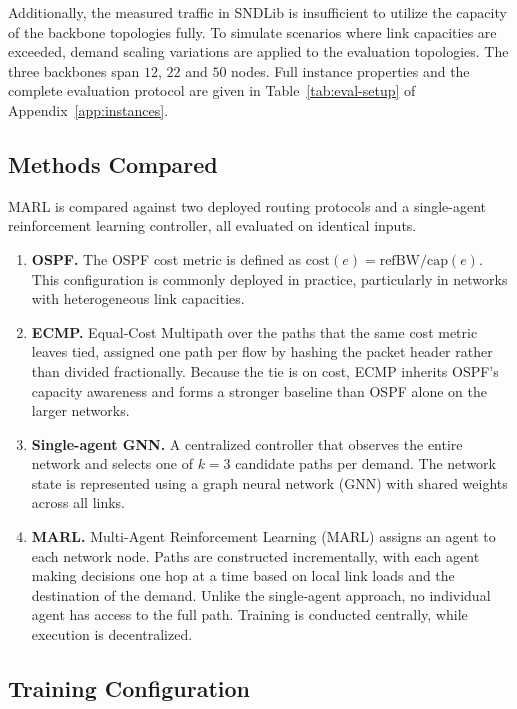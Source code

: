 Additionally, the measured traffic in SNDLib is insufficient to utilize the capacity of the backbone topologies fully. To simulate scenarios where link capacities are exceeded, demand scaling variations are applied to the evaluation topologies.  The three backbones span $12$, $22$ and $50$ nodes. Full instance properties and the complete evaluation protocol are given in Table~\ref{tab:eval-setup} of Appendix~\ref{app:instances}.


\subsection{Methods Compared}
\label{sec:setup-methods}

MARL is compared against two deployed routing protocols and a single-agent reinforcement learning controller, all evaluated on identical inputs.

\begin{enumerate}
    \item \textbf{OSPF.} The OSPF cost metric is defined as $\text{cost}(e) = \text{refBW}/\text{cap}(e)$. This configuration is commonly deployed in practice, particularly in networks with heterogeneous link capacities.
    \item \textbf{ECMP.} Equal-Cost Multipath \citep{hopps2000ecmp} over the paths that the same cost metric leaves tied, assigned one path per flow by hashing the packet header rather than divided fractionally. Because the tie is on cost, ECMP inherits OSPF's capacity awareness and forms a stronger baseline than OSPF alone on the larger networks.
    \item \textbf{Single-agent GNN.} A centralized controller that observes the entire network and selects one of $k=3$ candidate paths per demand. The network state is represented using a graph neural network (GNN) with shared weights across all links.
    \item \textbf{MARL.} Multi-Agent Reinforcement Learning (MARL) assigns an agent to each network node. Paths are constructed incrementally, with each agent making decisions one hop at a time based on local link loads and the destination of the demand. Unlike the single-agent approach, no individual agent has access to the full path. Training is conducted centrally, while execution is decentralized.
\end{enumerate}


\subsection{Training Configuration}
\label{sec:setup-hyper}

